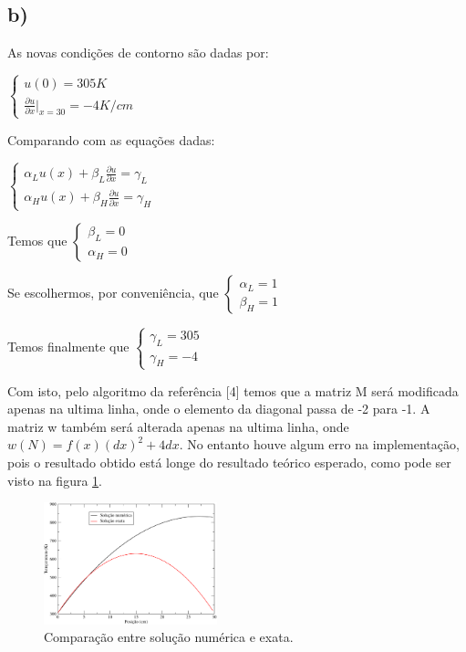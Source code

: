 \documentclass[a4wide]{report}
\begin{document}
\subsection*{b)}

As novas condições de contorno são dadas por:


$\begin{cases} 
u(0) = 305 K \\ 
\frac{\partial u}{\partial x} \Big|_{x=30} = -4 K/cm
\end{cases} $
\vspace{3pt}


Comparando com as equações dadas:

\vspace{3pt}

$\begin{cases} 
\alpha_L u(x) + \beta_L \frac{\partial u}{\partial x} = \gamma_L \\ 
\alpha_H u(x) + \beta_H \frac{\partial u}{\partial x} = \gamma_H
\end{cases} $

\vspace{3pt}

Temos que 
$\begin{cases} 
\beta_L = 0 \\ 
\alpha_H = 0
\end{cases} $


Se escolhermos, por conveniência, que
$\begin{cases} 
\alpha_L = 1 \\ 
\beta_H = 1
\end{cases} $

Temos finalmente que
$\begin{cases} 
\gamma_L = 305 \\ 
\gamma_H = -4
\end{cases} $

Com isto, pelo algoritmo da referência [4] temos que a matriz M será modificada apenas na ultima linha, onde o elemento da diagonal passa de -2 para -1. A matriz w também será alterada apenas na ultima linha, onde $w(N) = f(x) (dx)^2 + 4 dx$. No entanto houve algum erro na implementação, pois o resultado obtido está longe do resultado teórico esperado, como pode ser visto na figura \ref{ultimo}.


\begin{figure}[!t]
\centering
\includegraphics[width=0.447\textwidth]{g.pdf}
\caption{Comparação entre solução numérica e exata.}
\label{ultimo}
\end{figure}
\end{document}
